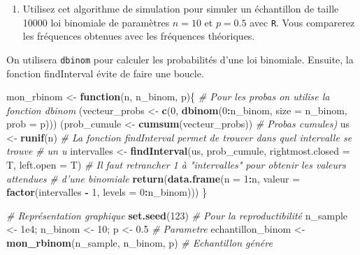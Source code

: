 \documentclass[]{article}
\newenvironment{Shaded}{\begin{snugshade}}{\end{snugshade}}
\newcommand{\CommentTok}[1]{\textcolor[rgb]{0.56,0.35,0.01}{\textit{#1}}}
\newcommand{\ControlFlowTok}[1]{\textcolor[rgb]{0.13,0.29,0.53}{\textbf{#1}}}
\newcommand{\DataTypeTok}[1]{\textcolor[rgb]{0.13,0.29,0.53}{#1}}
\newcommand{\DecValTok}[1]{\textcolor[rgb]{0.00,0.00,0.81}{#1}}
\newcommand{\FloatTok}[1]{\textcolor[rgb]{0.00,0.00,0.81}{#1}}
\newcommand{\KeywordTok}[1]{\textcolor[rgb]{0.13,0.29,0.53}{\textbf{#1}}}
\newcommand{\NormalTok}[1]{#1}
\newcommand{\OperatorTok}[1]{\textcolor[rgb]{0.81,0.36,0.00}{\textbf{#1}}}
\newcommand{\StringTok}[1]{\textcolor[rgb]{0.31,0.60,0.02}{#1}}
\providecommand{\tightlist}{%
  \setlength{\itemsep}{0pt}\setlength{\parskip}{0pt}}
\newenvironment{Correction}%
  { \vspace{\baselineskip}\begin{mdframed}[backgroundcolor=my_green]}%
  {\end{mdframed}}
\begin{document}
\begin{enumerate}
\def\labelenumi{\arabic{enumi}.}
\setcounter{enumi}{2}
\tightlist
\item
  Utilisez cet algorithme de simulation pour simuler un échantillon de
  taille 10000 loi binomiale de paramètres \(n = 10\) et \(p = 0.5\)
  avec \texttt{R}. Vous comparerez les fréquences obtenues avec les
  fréquences théoriques.
\end{enumerate}

\begin{Correction}

On utilisera \texttt{dbinom} pour calculer les probabilités d'une loi binomiale.
Ensuite, la fonction findInterval évite de faire une boucle.

\end{Correction}

\begin{Shaded}
\begin{Highlighting}[]
\NormalTok{mon_rbinom <-}\StringTok{ }\ControlFlowTok{function}\NormalTok{(n, n_binom, p)\{}
  \CommentTok{# Pour les probas on utilise la fonction dbinom}
\NormalTok{  (vecteur_probs <-}\StringTok{ }\KeywordTok{c}\NormalTok{(}\DecValTok{0}\NormalTok{, }\KeywordTok{dbinom}\NormalTok{(}\DecValTok{0}\OperatorTok{:}\NormalTok{n_binom, }\DataTypeTok{size =}\NormalTok{ n_binom, }\DataTypeTok{prob =}\NormalTok{ p)))}
\NormalTok{  (prob_cumule <-}\StringTok{ }\KeywordTok{cumsum}\NormalTok{(vecteur_probs)) }\CommentTok{# Probas cumules)}
\NormalTok{  us <-}\StringTok{ }\KeywordTok{runif}\NormalTok{(n)}
  \CommentTok{# La fonction findInterval permet de trouver dans quel intervalle se trouve}
  \CommentTok{# un u}
\NormalTok{  intervalles <-}\StringTok{ }\KeywordTok{findInterval}\NormalTok{(us, prob_cumule, }\DataTypeTok{rightmost.closed =}\NormalTok{ T,}
                              \DataTypeTok{left.open =}\NormalTok{ T)}
  \CommentTok{# Il faut retrancher 1 à "intervalles" pour obtenir les valeurs attendues}
  \CommentTok{# d'une binomiale}
  \KeywordTok{return}\NormalTok{(}\KeywordTok{data.frame}\NormalTok{(}\DataTypeTok{n =} \DecValTok{1}\OperatorTok{:}\NormalTok{n,}
                    \DataTypeTok{valeur =} \KeywordTok{factor}\NormalTok{(intervalles }\OperatorTok{-}\StringTok{ }\DecValTok{1}\NormalTok{, }\DataTypeTok{levels =} \DecValTok{0}\OperatorTok{:}\NormalTok{n_binom)))}
\NormalTok{\}}
\end{Highlighting}
\end{Shaded}

\begin{Shaded}
\begin{Highlighting}[]
\CommentTok{# Représentation graphique}
\KeywordTok{set.seed}\NormalTok{(}\DecValTok{123}\NormalTok{) }\CommentTok{# Pour la reproductibilité}
\NormalTok{n_sample <-}\StringTok{ }\FloatTok{1e4}\NormalTok{; n_binom <-}\StringTok{ }\DecValTok{10}\NormalTok{; p <-}\StringTok{ }\FloatTok{0.5} \CommentTok{# Parametre}
\NormalTok{echantillon_binom <-}\StringTok{ }\KeywordTok{mon_rbinom}\NormalTok{(n_sample, n_binom, p) }\CommentTok{# Echantillon génére}
\end{Highlighting}
\end{Shaded}
\end{document}

